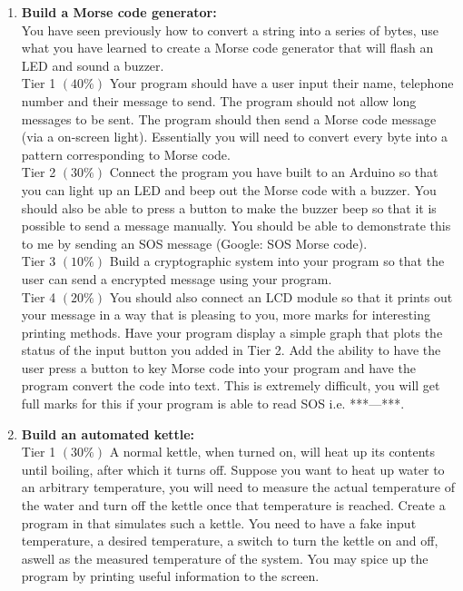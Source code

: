 \begin{enumerate}
	  \item \textbf{Build a Morse code generator:}\\
	  You have seen previously how to convert a string into a series of bytes, use what you have learned to create a Morse code generator that will flash an LED and sound a buzzer.\\
	  
	  Tier 1 $\left(40\%\right)$ Your program should have a user input their name, telephone number and their message to send. The program should not allow long messages to be sent. The program should then send a Morse code message (via a on-screen light). Essentially you will need to convert every byte into a pattern corresponding to Morse code.\\
	  
	  Tier 2 $\left(30\%\right)$ Connect the program you have built to an Arduino so that you can light up an LED and beep out the Morse code with a buzzer. You should also be able to press a button to make the buzzer beep so that it is possible to send a message manually. You should be able to demonstrate this to me by sending an SOS message (Google: SOS Morse code).\\
	  
	  Tier 3 $\left(10\%\right)$ Build a cryptographic system into your program so that the user can send a encrypted message using your program.\\
	  
	  Tier 4 $\left(20\%\right)$ You should also connect an LCD module so that it prints out your message in a way that is pleasing to you, more marks for interesting printing methods. Have your program display a simple graph that plots the status of the input button you added in Tier 2. Add the ability to have the user press a button to key Morse code into your program and have the program convert the code into text. This is extremely difficult, you will get full marks for this if your program is able to read SOS i.e. ***---***.\\
	  
	  \item \textbf{Build an automated kettle:}\\
	  
	  Tier 1 $\left(30\%\right)$ A normal kettle, when turned on, will heat up its contents until boiling, after which it turns off. Suppose you want to heat up water to an arbitrary temperature, you will need to measure the actual temperature of the water and turn off the kettle once that temperature is reached. Create a program in \labview that simulates such a kettle. You need to have a fake input temperature, a desired temperature, a switch to turn the kettle on and off, aswell as the measured temperature of the system. You may spice up the program by printing useful information to the screen.\\
	  

\end{enumerate}
